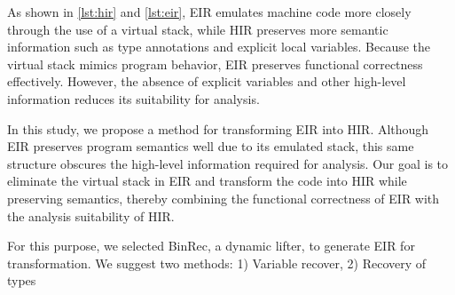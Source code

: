 As shown in \autoref{lst:hir} and \autoref{lst:eir}, EIR emulates machine code more closely through the use of a
virtual stack, while HIR preserves more semantic information such as type
annotations and explicit local variables. Because the virtual stack mimics
program behavior, EIR preserves functional correctness effectively. However,
the absence of explicit variables and other high-level information reduces its
suitability for analysis.

In this study, we propose a method for transforming EIR into HIR. Although EIR
preserves program semantics well due to its emulated stack, this same structure
obscures the high-level information required for analysis. Our goal is to
eliminate the virtual stack in EIR and transform the code into HIR while
preserving semantics, thereby combining the functional correctness of EIR with
the analysis suitability of HIR.

For this purpose, we selected BinRec, a dynamic lifter, to generate EIR for
transformation. We suggest two methods: 1) Variable recover, 2) Recovery of
types
